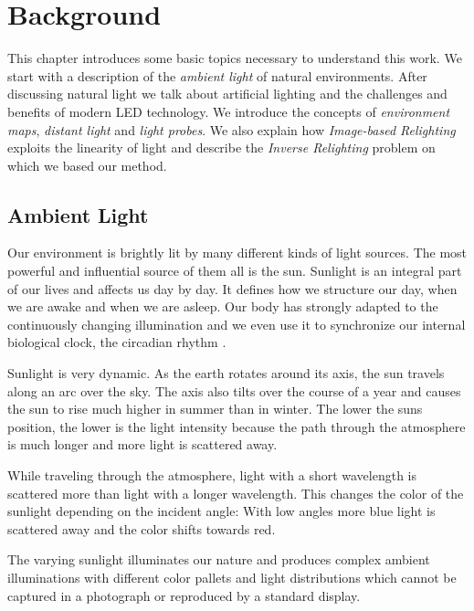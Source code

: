 
\chapter{Background}

This chapter introduces some basic topics necessary to understand this work. 
We start with a description of the \emph{ambient light} of natural environments.
After discussing natural light we talk about artificial lighting and the challenges and benefits of modern LED technology.
We introduce the concepts of \emph{environment maps}, \emph{distant light} and \emph{light probes}.
We also explain how \emph{Image-based Relighting} exploits the linearity of light and describe the \emph{Inverse Relighting} problem on which we based our method.

\section{Ambient Light}

Our environment is brightly lit by many different kinds of light sources. The most powerful and influential source of them all is the sun.
Sunlight is an integral part of our lives and affects us day by day. It defines how we structure our day, when we are awake and when we are asleep. 
Our body has strongly adapted to the continuously changing illumination and we even use it to synchronize our internal biological clock, the circadian rhythm  \cite{ellis2013auto}.

Sunlight is very dynamic.
As the earth rotates around its axis, the sun travels along an arc over the sky. 
The axis also tilts over the course of a year and causes the sun to rise much higher in summer than in winter.
The lower the suns position, the lower is the light intensity because the path through the atmosphere is much longer and more light is scattered away.

While traveling through the atmosphere, light with a short wavelength is scattered more than light with a longer wavelength.
This changes the color of the sunlight depending on the incident angle: With low angles more blue light is scattered away and the color shifts towards red.

The varying sunlight illuminates our nature and produces complex ambient illuminations with different color pallets and light distributions
 which cannot be captured in a photograph or reproduced by a standard display.
 
